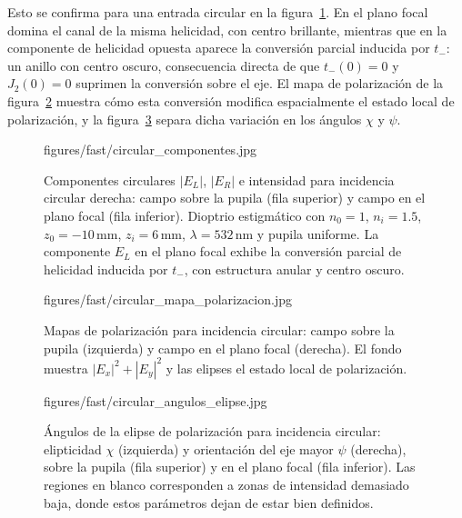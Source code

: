 Esto se confirma para una entrada circular en la figura~\ref{fig:circular-plano-focal-componentes}. En el plano focal domina el canal de la misma helicidad, con centro brillante, mientras que en la componente de helicidad opuesta aparece la conversión parcial inducida por $t_-$: un anillo con centro oscuro, consecuencia directa de que $t_-(0)=0$ y $J_2(0)=0$ suprimen la conversión sobre el eje. El mapa de polarización de la figura~\ref{fig:circular-plano-focal-mapa-polarizacion} muestra cómo esta conversión modifica espacialmente el estado local de polarización, y la figura~\ref{fig:circular-plano-focal-mapas-escalares} separa dicha variación en los ángulos $\chi$ y $\psi$.

\begin{figure}[H]
  \centering
    {figures/fast/circular_componentes.jpg}
  \caption{Componentes circulares $|E_L|$, $|E_R|$ e intensidad para incidencia circular derecha: campo sobre la pupila (fila superior) y campo en el plano focal (fila inferior). Dioptrio estigmático con $n_0=1$, $n_i=1.5$, $z_0=-10\,\mathrm{mm}$, $z_i=6\,\mathrm{mm}$, $\lambda=532\,\mathrm{nm}$ y pupila uniforme. La componente $E_L$ en el plano focal exhibe la conversión parcial de helicidad inducida por $t_-$, con estructura anular y centro oscuro.}
  \label{fig:circular-plano-focal-componentes}
\end{figure}

\begin{figure}[H]
  \centering
    {figures/fast/circular_mapa_polarizacion.jpg}
  \caption{Mapas de polarización para incidencia circular: campo sobre la pupila (izquierda) y campo en el plano focal (derecha). El fondo muestra $|E_x|^2+|E_y|^2$ y las elipses el estado local de polarización.}
  \label{fig:circular-plano-focal-mapa-polarizacion}
\end{figure}

\begin{figure}[H]
  \centering
    {figures/fast/circular_angulos_elipse.jpg}
  \caption{Ángulos de la elipse de polarización para incidencia circular: elipticidad $\chi$ (izquierda) y orientación del eje mayor $\psi$ (derecha), sobre la pupila (fila superior) y en el plano focal (fila inferior). Las regiones en blanco corresponden a zonas de intensidad demasiado baja, donde estos parámetros dejan de estar bien definidos.}
  \label{fig:circular-plano-focal-mapas-escalares}
\end{figure}

